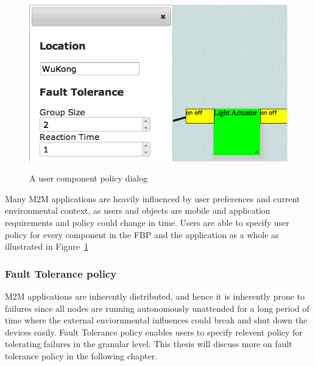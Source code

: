 \begin{figure}[h!]
\caption{A user component policy dialog}
\centering
    \includegraphics[width=\linewidth]{figures/fbp-policy}
\label{fig:fbp-policy}
\end{figure}

Many M2M applications are heavily influenced by user preferences and current
environmental context, as users and objects are mobile and application
requirements and policy could change in time. Users are able to specify
user policy for every component in the FBP and the application as a whole as
illustrated in Figure~\ref{fig:fbp-policy}

\subsubsection{Fault Tolerance policy}

M2M applications are inherently distributed, and hence it is inherently prone
to failures since all nodes are running autonomously unattended for a long
period of time where the external enviornmental influences could break and shut
down the devices easily. Fault Tolerance policy enables users to specify
relevent policy for tolerating failures in the granular level. This thesis will
discuss more on fault tolerance policy in the following chapter.
